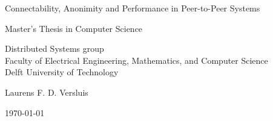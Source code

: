 \begin{titlepage}

  \begin{center}
  \null\vfill
    \begin{center}
    \LARGE{Connectability, Anonimity and Performance in Peer-to-Peer Systems}
    \end{center}

    \vspace{3cm}

    \begin{large}
    Master's Thesis in Computer Science
    \end{large}

    \vspace{1.5cm}

    \begin{normalsize}
	Distributed Systems group\\
    Faculty of Electrical Engineering, Mathematics, and Computer Science\\
    Delft University of Technology
    \end{normalsize}

    \vspace{2.0cm}

    \begin{normalsize}
    Laurens F. D. Versluis
    \end{normalsize}

    \vspace{1.0cm}

    \today

  \vfill
  \end{center}

\end{titlepage}

